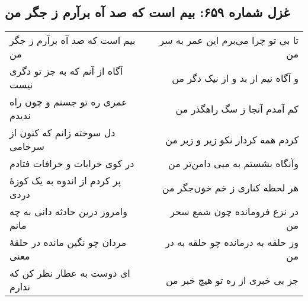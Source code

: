 \begin{center}
\section*{غزل شماره ۶۵۹: بیم است که صد آه برآرم ز جگر من}
\label{sec:659}
\begin{longtable}{l p{0.5cm} r}
بیم است که صد آه برآرم ز جگر من
&&
تا بی تو چرا می‌برم این عمر به سر من
\\
آگاه از آنم که به جز تو دگری نیست
&&
و آگاه نیم از بد و از نیک دگر من
\\
عمری ره تو جستم و چون راه ندیدم
&&
کم آمدم آنجا ز سگ راهگذر من
\\
دل سوخته زانم که کنون از سرخامی
&&
کردم همه کردار نکو زیر و زبر من
\\
در کوی خرابات و خرافات فتادم
&&
وآنگاه بشستم به میی دامن‌تر من
\\
پر کردم از اندوه به یک کوزهٔ دردی
&&
هر لحظه کناری ز خم خون‌جگر من
\\
وامروز درین حادثه دانی به چه مانم
&&
در نزع فرومانده چون شمع سحر من
\\
مردان چو نگین مانده در حلقهٔ معنی
&&
وز حلقه به درمانده چو حلقه به در من
\\
ای دوست به عطار نظر کن که ندارم
&&
جز بی خبری از ره تو هیچ خبر من
\\
\end{longtable}
\end{center}

